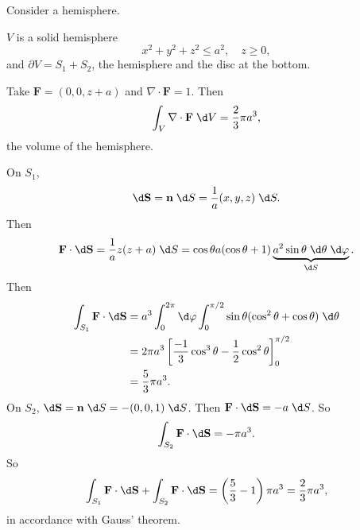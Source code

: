 \documentclass[a4paper]{article}
\begin{document}
\begin{eg}
  Consider a hemisphere.
  \begin{center}
  \end{center}

  $V$ is a solid hemisphere
  \[
    x^2 + y^2 + z^2 \leq a^2, \quad z \geq 0,
  \]
  and $\partial V = S_1 + S_2$, the hemisphere and the disc at the bottom.

  Take $\mathbf{F} = (0, 0, z + a)$ and $\nabla \cdot \mathbf{F} = 1$. Then
  \[
    \int_V\nabla \cdot \mathbf{F}\;\d V = \frac{2}{3}\pi a^3,
  \]
  the volume of the hemisphere.

  On $S_1$,
  \[
    \d \mathbf{S} = \mathbf{n}\;\d S = \frac{1}{a}(x, y, z)\;\d S.
  \]
  Then
  \[
    \mathbf{F}\cdot \d \mathbf{S} = \frac{1}{a}z(z + a)\;\d S = \cos \theta a(\cos \theta + 1)\underbrace{a^2\sin \theta\;\d \theta\;\d \varphi}_{\d S}.
  \]
  Then
  \begin{align*}
    \int_{S_1}\mathbf{F}\cdot \d \mathbf{S} &= a^3\int_0^{2\pi}\d \varphi \int_0^{\pi/2}\sin \theta(\cos^2\theta + \cos \theta)\;\d \theta\\
    &= 2\pi a^3 \left[\frac{-1}{3}\cos^3 \theta - \frac{1}{2}\cos^2 \theta\right]_0^{\pi/2}\\
    &= \frac{5}{3}\pi a^3.
  \end{align*}
  On $S_2$, $\d \mathbf{S} = \mathbf{n}\;\d S = -(0, 0, 1)\;\d S$. Then $\mathbf{F}\cdot \d \mathbf{S} = -a\;\d S$. So
  \[
    \int_{S_2} \mathbf{F}\cdot \d \mathbf{S} = -\pi a^3.
  \]
  So
  \[
    \int_{S_1}\mathbf{F}\cdot \d \mathbf{S} +\int_{S_2}\mathbf{F}\cdot \d \mathbf{S} = \left(\frac{5}{3} - 1\right)\pi a^3 = \frac{2}{3}\pi a^3,
  \]
  in accordance with Gauss' theorem.
\end{eg}
\end{document}
